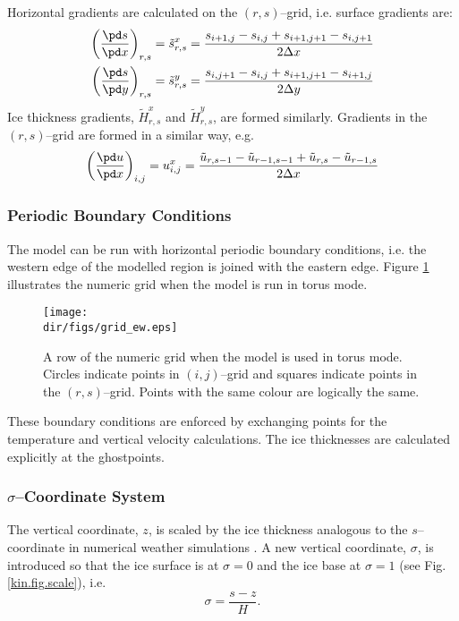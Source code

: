 Horizontal gradients are calculated on the $(r,s)$--grid, i.e. surface gradients are:
\begin{subequations}
\begin{align}
  \left(\frac{\pd s}{\pd x}\right)_{r,s}=\tilde{s}^x_{r,s}&=\frac{s_{i+1,j}-s_{i,j}+s_{i+1,j+1}-s_{i,j+1}}{2\Delta x}\\
  \left(\frac{\pd s}{\pd y}\right)_{r,s}=\tilde{s}^y_{r,s}&=\frac{s_{i,j+1}-s_{i,j}+s_{i+1,j+1}-s_{i+1,j}}{2\Delta y}
\end{align}  
\end{subequations}
Ice thickness gradients, $\tilde{H}^x_{r,s}$ and $\tilde{H}^y_{r,s}$, are formed similarly. Gradients in the $(r,s)$--grid are formed in a similar way, e.g. 
\begin{equation}
  \left(\frac{\pd u}{\pd x}\right)_{i,j}=u^x_{i,j}=\frac{\tilde{u}_{r,s-1}-\tilde{u}_{r-1,s-1}+\tilde{u}_{r,s}-\tilde{u}_{r-1,s}}{2\Delta x}
\end{equation}

\subsubsection{Periodic Boundary Conditions}
The model can be run with horizontal periodic boundary conditions, i.e. the western edge of the modelled region is joined with the eastern edge. Figure \ref{num.fig.grid_ew} illustrates the numeric grid when the model is run in torus mode.

\begin{figure}[htbp]
  \centering
  \texttt{[image: \\dir/figs/grid\_ew.eps]}
  \caption{A row of the numeric grid when the model is used in torus mode. Circles indicate points in $(i,j)$--grid and squares indicate points in the $(r,s)$--grid. Points with the same colour are logically the same.}
  \label{num.fig.grid_ew}
\end{figure}

These boundary conditions are enforced by exchanging points for the temperature and vertical velocity calculations. The ice thicknesses are calculated explicitly at the ghostpoints.

\subsubsection{$\sigma$--Coordinate System}\label{num.sec.sigma}
The vertical coordinate, $z$, is scaled by the ice thickness analogous to the $s$--coordinate in numerical weather simulations \citep[e.g.][]{Holton1992}. A new vertical coordinate, $\sigma$, is introduced so that the ice surface is at $\sigma=0$ and the ice base at $\sigma=1$ (see Fig. \ref{kin.fig.scale}), i.e.
\begin{equation}
  \label{kin.eq.vertical_scale}
  \sigma=\frac{s-z}{H}.
\end{equation}


